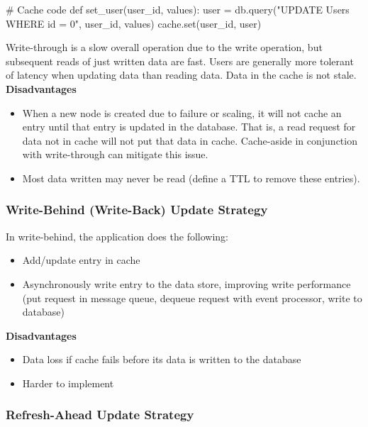 \documentclass[12pt, titlepage]{article}
\begin{document}
\begin{python}
# Cache code
def set_user(user_id, values):
    user = db.query("UPDATE Users WHERE id = {0}", user_id, values)
    cache.set(user_id, user)
\end{python}

Write-through is a slow overall operation due to the write operation, but subsequent reads of just written data are fast. Users are generally more tolerant of latency when updating data than reading data. Data in the cache is not stale. \\

\textbf{Disadvantages}
\begin{itemize}
  \item When a new node is created due to failure or scaling, it will not cache an entry until that entry is updated in the database. That is, a read request for data not in cache will not put that data in cache. Cache-aside in conjunction with write-through can mitigate this issue.
  \item Most data written may never be read (define a TTL to remove these entries).
\end{itemize}

\subsubsection{Write-Behind (Write-Back) Update Strategy}

In write-behind, the application does the following:

\begin{itemize}
  \item Add/update entry in cache
  \item Asynchronously write entry to the data store, improving write performance (put request in message queue, dequeue request with event processor, write to database)
\end{itemize}

\textbf{Disadvantages}
\begin{itemize}
  \item Data loss if cache fails before its data is written to the database
  \item Harder to implement
\end{itemize}

\subsubsection{Refresh-Ahead Update Strategy}
\end{document}
